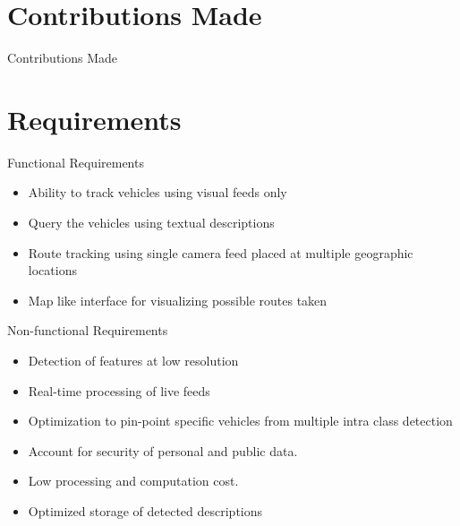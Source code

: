 \documentclass{beamer}
\begin{document}

\section{Contributions Made}
\begin{frame}{Contributions Made}
\end{frame}


\section{Requirements}
\begin{frame}{Functional Requirements}
	\begin{itemize}
		\item Ability to track vehicles using visual feeds only
		\item Query the vehicles using textual descriptions
		\item Route tracking using single camera feed placed at multiple geographic locations
		\item Map like interface for visualizing possible routes taken
		
	\end{itemize}
\end{frame}

\begin{frame}{Non-functional Requirements}
    \begin{itemize}
        \item Detection of features at low resolution
        \item Real-time processing of live feeds
        \item Optimization to pin-point specific vehicles from multiple intra class detection
        \item Account for security of personal and public data.
        \item Low processing and computation cost.
        \item Optimized storage of detected descriptions
    \end{itemize}
\end{frame}

\end{document}

